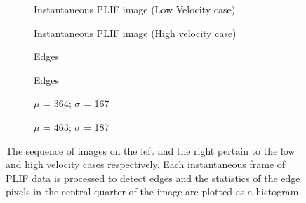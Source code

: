 \begin{figure}

\centering

\begin{subfigure}{0.45\linewidth}
  \centering
  
  \caption{Instantaneous PLIF image (Low Velocity case)}
  \label{fig:referenceVelocityLowVelPLIFImage}
\end{subfigure}
\hfill
\begin{subfigure}{0.45\linewidth}
  \centering
  
  \caption{Instantaneous PLIF image (High velocity case)}
  \label{fig:referenceVelocityHighVelPLIFImage}
\end{subfigure}

\begin{subfigure}{0.45\linewidth}
  \centering
  
  \caption{Edges}
  \label{fig:referenceVelocityLowVelPLIFEdge}
\end{subfigure}
\hfill
\begin{subfigure}{0.45\linewidth}
  \centering
  
  \caption{Edges}
  \label{fig:referenceVelocityHighVelPLIFEdge}
\end{subfigure}

\begin{subfigure}{0.45\linewidth}
  \centering
  
  \caption{\(\mu\) = 364; \(\sigma\) = 167}
  \label{fig:referenceVelocityLowVelPLIFHistogram}
\end{subfigure}
\hfill
\begin{subfigure}{0.45\linewidth}
  \centering
  
  \caption{\(\mu\) = 463; \(\sigma\) = 187}
  \label{fig:referenceVelocityHighVelPLIFHistogram}
\end{subfigure}

\caption[Effect of Reference Velocity on Flame Structure]{The sequence of images on the left and the right pertain to the low and high velocity cases respectively. Each instantaneous frame of PLIF data is processed to detect edges and the statistics of the edge pixels in the central quarter of the image are plotted as a histogram.}

\label{fig:referenceVelocityPLIFResults}

\end{figure}

